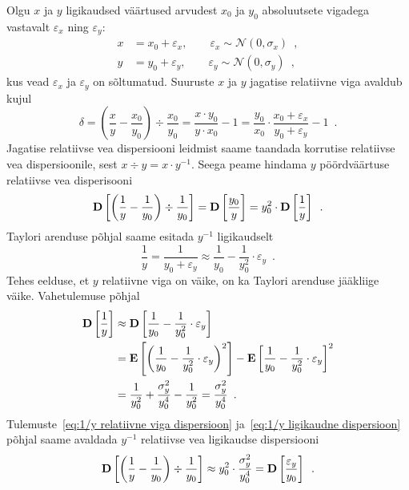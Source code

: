Olgu $x$ ja $y$ ligikaudsed väärtused arvudest $x_0$ ja $y_0$ absoluutsete vigadega vastavalt $\varepsilon_x$ ning $\varepsilon_y$:
\begin{align*}
    x &= x_0 + \varepsilon_x ,\qquad \varepsilon_x \sim \mathcal{N}(0, \sigma_x) \enspace,\\
    y &= y_0 + \varepsilon_y ,\qquad \varepsilon_y \sim \mathcal{N}(0, \sigma_y) \enspace,
\end{align*}
kus vead $\varepsilon_x$ ja $\varepsilon_y$ on sõltumatud. Suuruste $x$ ja $y$ jagatise relatiivne viga avaldub kujul
\begin{equation*}
    \delta = \left( \frac{x}{y} - \frac{x_0}{y_0} \right) \div \frac{x_0}{y_0} = \frac{x \cdot y_0}{y \cdot x_0} - 1 = \frac{y_0}{x_0} \cdot \frac{x_0 + \varepsilon_x}{y_0 + \varepsilon_y} - 1 \enspace.
\end{equation*}
Jagatise relatiivse vea dispersiooni leidmist saame taandada korrutise relatiivse vea dispersioonile, sest $x \div y = x \cdot y^{-1}$. Seega peame hindama $y$ pöördväärtuse relatiivse vea disperisooni
\begin{equation}
    \label{eq:1/y relatiivne viga dispersioon}
    \operatorname*{\mathbf{D}}\left[\left( \frac{1}{y} - \frac{1}{y_0} \right) \div \frac{1}{y_0}\right] = \operatorname*{\mathbf{D}}\left[\frac{y_0}{y}\right] = y_0^2 \cdot \operatorname*{\mathbf{D}}\left[\frac{1}{y}\right] \enspace.
\end{equation}
Taylori arenduse põhjal saame esitada $y^{-1}$ ligikaudselt
\begin{equation*}
    \frac{1}{y} = \frac{1}{y_0 + \varepsilon_y} \approx \frac{1}{y_0} - \frac{1}{y_0^2} \cdot \varepsilon_y \enspace.
\end{equation*}
Tehes eelduse, et $y$ relatiivne viga on väike, on ka Taylori arenduse jääkliige väike.
Vahetulemuse põhjal
\begin{align}
    \operatorname*{\mathbf{D}}\left[\frac{1}{y}\right]
    &\approx \operatorname*{\mathbf{D}}\left[\frac{1}{y_0} - \frac{1}{y_0^2} \cdot \varepsilon_y\right] \nonumber \\
    &= \operatorname*{\mathbf{E}}\left[\left( \frac{1}{y_0} - \frac{1}{y_0^2} \cdot \varepsilon_y \right)^2\right] - \operatorname*{\mathbf{E}}\left[\frac{1}{y_0} - \frac{1}{y_0^2} \cdot \varepsilon_y\right]^2 \nonumber \\
    &= \frac{1}{y_0^2} + \frac{\sigma_y^2}{y_0^4} - \frac{1}{y_0^2} = \frac{\sigma_y^2}{y_0^4} \enspace. \label{eq:1/y ligikaudne dispersioon}
\end{align}
Tulemuste~\eqref{eq:1/y relatiivne viga dispersioon} ja~\eqref{eq:1/y ligikaudne dispersioon} põhjal saame avaldada $y^{-1}$ relatiivse vea ligikaudse dispersiooni
\begin{equation*}
    \operatorname*{\mathbf{D}}\left[\left( \frac{1}{y} - \frac{1}{y_0} \right) \div \frac{1}{y_0}\right] \approx y_0^2 \cdot \frac{\sigma_y^2}{y_0^4} = \operatorname*{\mathbf{D}}\left[\frac{\varepsilon_y}{y_0}\right] \enspace.
\end{equation*}
